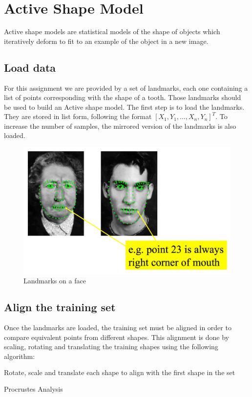 \section{Active Shape Model}

Active shape models are statistical models of the shape
of objects which iteratively deform to fit to an example
of the object in a new image.

\subsection{Load data}
For this assignment we are provided by a set of landmarks, each one
containing a list of points corresponding with the shape of a tooth.
Those landmarks should be used to build an Active shape model.
The first step is to load the landmarks. They are stored in list form,
following the format ${[X_1, Y_1, \ldots, X_n, Y_n]}^T$. To increase
the number of samples, the mirrored version of the landmarks is also
loaded.

\begin{figure}
  \centering
  \includegraphics[width=0.7\linewidth]{img/landmarks}
  \caption{Landmarks on a face}
\end{figure}


\subsection{Align the training set}
Once the landmarks are loaded, the training set must be aligned in
order to compare equivalent points from different shapes. This
alignment is done by scaling, rotating and translating the training
shapes using the following algorithm:

\begin{algorithm}
Rotate, scale and translate each shape to align with the
first shape in the set\;
\caption{Procrustes Analysis}
\end{algorithm}


